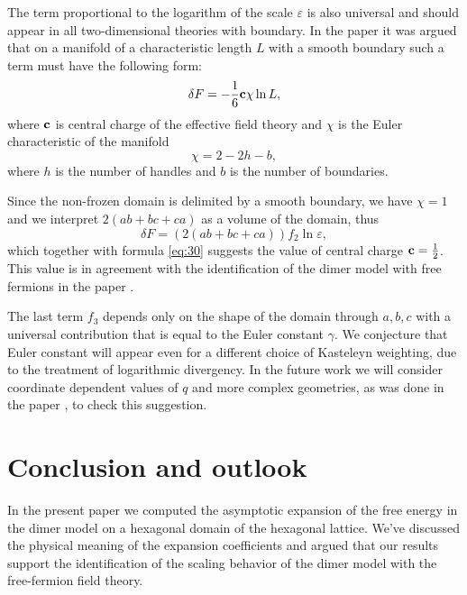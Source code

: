 \documentclass{article}
\begin{document}
The term proportional to the logarithm of the scale $\varepsilon$ is also universal
\cite{cardy1988finite} and should appear in all two-dimensional theories with boundary. In the paper
\cite{cardy1988finite} it was argued that on a manifold of a characteristic length $L$ with a smooth
boundary such a term must have the following form:
\begin{equation}
  \label{eq:31}
  \delta F = -\frac{1}{6}{\bf c} \chi \ln L,
\end{equation}
where ${\bf c}$ is central charge of the effective field theory and $\chi$ is the Euler characteristic of
the manifold
\begin{equation}
  \label{eq:32}
  \chi=2-2 h-b,
\end{equation}
where $h$ is the number of handles and $b$ is the number of boundaries. 

Since the non-frozen domain is delimited by a smooth boundary, we have $\chi=1$ and we interpret
$2(ab+bc+ca)$ as a volume of the domain, thus
\begin{equation}
  \label{eq:33}
  \delta F = \left(2(ab+bc+ca)\right) f_{2}\ln\varepsilon,
\end{equation}
which together with formula \eqref{eq:30} suggests the value of central charge
${\bf c}=\frac{1}{2}$. This value is in agreement with the identification of the dimer model with
free fermions in the paper \cite{dijkgraaf2009dimer}.

The last term $f_{3}$ depends only on the shape of the domain through $a,b,c$ with a universal
contribution that is equal to the Euler constant $\gamma$. We conjecture that Euler constant will
appear even for a different choice of Kasteleyn weighting, due to the treatment of logarithmic
divergency. In the future work we will consider coordinate dependent values of $q$ and more complex
geometries, as was done in the paper \cite{okounkov2007random}, to check this suggestion. 


\section*{Conclusion and outlook}
\label{sec:conclusion}

In the present paper we computed the asymptotic expansion of the free energy in the dimer model on a
hexagonal domain of the hexagonal lattice. We've discussed the physical meaning of the expansion
coefficients and argued that our results support the identification of the scaling behavior of the
dimer model with the free-fermion field theory.
\end{document}
